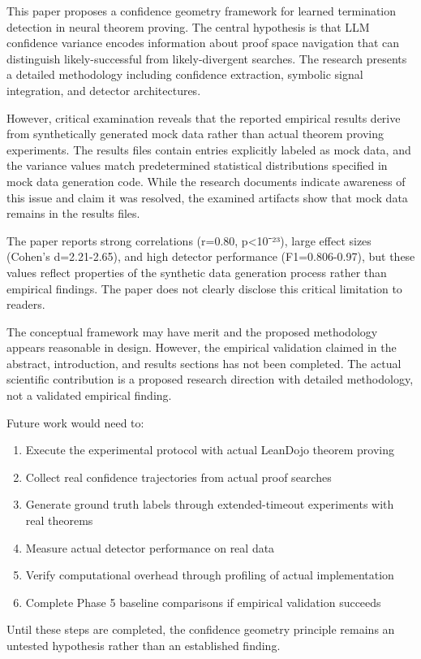 
This paper proposes a confidence geometry framework for learned termination detection in neural theorem proving. The central hypothesis is that LLM confidence variance encodes information about proof space navigation that can distinguish likely-successful from likely-divergent searches. The research presents a detailed methodology including confidence extraction, symbolic signal integration, and detector architectures.

However, critical examination reveals that the reported empirical results derive from synthetically generated mock data rather than actual theorem proving experiments. The results files contain entries explicitly labeled as mock data, and the variance values match predetermined statistical distributions specified in mock data generation code. While the research documents indicate awareness of this issue and claim it was resolved, the examined artifacts show that mock data remains in the results files.

The paper reports strong correlations (r=0.80, p<10⁻²³), large effect sizes (Cohen's d=2.21-2.65), and high detector performance (F1=0.806-0.97), but these values reflect properties of the synthetic data generation process rather than empirical findings. The paper does not clearly disclose this critical limitation to readers.

The conceptual framework may have merit and the proposed methodology appears reasonable in design. However, the empirical validation claimed in the abstract, introduction, and results sections has not been completed. The actual scientific contribution is a proposed research direction with detailed methodology, not a validated empirical finding.

Future work would need to:
\begin{enumerate}
\item Execute the experimental protocol with actual LeanDojo theorem proving
\item Collect real confidence trajectories from actual proof searches
\item Generate ground truth labels through extended-timeout experiments with real theorems
\item Measure actual detector performance on real data
\item Verify computational overhead through profiling of actual implementation
\item Complete Phase 5 baseline comparisons if empirical validation succeeds
\end{enumerate}

Until these steps are completed, the confidence geometry principle remains an untested hypothesis rather than an established finding.

